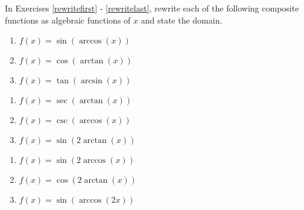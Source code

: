 \documentclass{ximera}
\begin{document}
In Exercises \ref{rewritefirst} - \ref{rewritelast}, rewrite each of the following composite functions as algebraic functions of $x$ and state the domain.
\begin{multicols}{3} 

\begin{enumerate}

\setcounter{enumi}{\value{HW}}

\item $f(x) = \sin \left( \arccos \left( x \right) \right)$ \label{rewritefirst}
\item $f(x) = \cos \left( \arctan \left( x \right) \right)$ 
\item $f(x) = \tan \left( \arcsin \left( x \right) \right)$ 

\setcounter{HW}{\value{enumi}}

\end{enumerate}

\end{multicols}

\begin{multicols}{3}

\begin{enumerate}

\setcounter{enumi}{\value{HW}}

\item $f(x) = \sec \left( \arctan \left( x \right) \right)$ 
\item $f(x) = \csc \left( \arccos \left( x \right) \right)$ 
\item$f(x) = \sin \left( 2\arctan \left( x \right) \right)$ 

\setcounter{HW}{\value{enumi}}

\end{enumerate}

\end{multicols}

\begin{multicols}{3}

\begin{enumerate}

\setcounter{enumi}{\value{HW}}

\item $f(x) = \sin \left( 2\arccos \left( x \right) \right)$ 
\item $f(x) = \cos \left( 2\arctan \left( x \right) \right)$ 
\item  $f(x) = \sin(\arccos(2x))$

\setcounter{HW}{\value{enumi}}

\end{enumerate}

\end{multicols}
\end{document}
